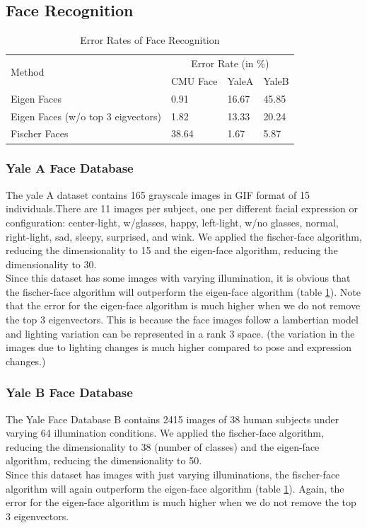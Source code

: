 \documentclass[12pt, a4paper]{article}
\begin{document}
\subsection{Face Recognition}
\begin{table}[H]
    \centering
    \begin{tabular}{ |p{4.1cm}|p{2.5cm}|p{2.5cm}|p{2.5cm}|  }
 \hline
\multirow{2}{0.1cm}{Method} & \multicolumn{3}{c|}{Error Rate (in \%)} \\
 \cline{2-4}
   &   CMU Face & YaleA & YaleB \\
 \hline
 Eigen Faces & 0.91 & 16.67 & 45.85 \\
 \hline
 Eigen Faces \newline (w/o top 3 eigvectors) & 1.82 & 13.33 & 20.24 \\
 \hline
 Fischer Faces & 38.64 & 1.67 & 5.87 \\
 \hline
\end{tabular}
    \caption{Error Rates of Face Recognition}
    \label{tab:face_recog}
\end{table}

\subsubsection{Yale A Face Database}
The yale A dataset contains 165 grayscale images in GIF format of 15 individuals.There are 11 images per subject, one per different facial expression or configuration: center-light, w/glasses, happy, left-light, w/no glasses, normal, right-light, sad, sleepy, surprised, and wink.
We applied the fischer-face algorithm, reducing the dimensionality to 15 and the eigen-face algorithm, reducing the dimensionality to 30. \\ Since this dataset has some images with varying illumination, it is obvious that the fischer-face algorithm will outperform the eigen-face algorithm (table \ref{tab:face_recog}). Note that the error for the eigen-face algorithm is much higher when we do not remove the top 3 eigenvectors. This is because the face images follow a lambertian model and lighting variation can be represented in a rank 3 space. (the variation in the images due to lighting changes is much higher compared to pose and expression changes.)

\subsubsection{Yale B Face Database}
The Yale Face Database B contains 2415 images of 38 human subjects under varying 64 illumination conditions. 
We applied the fischer-face algorithm, reducing the dimensionality to 38 (number of classes) and the eigen-face algorithm, reducing the dimensionality to 50. \\ Since this dataset has images with just varying illuminations, the fischer-face algorithm will again outperform the eigen-face algorithm (table \ref{tab:face_recog}). Again, the error for the eigen-face algorithm is much higher when we do not remove the top 3 eigenvectors.
\end{document}
